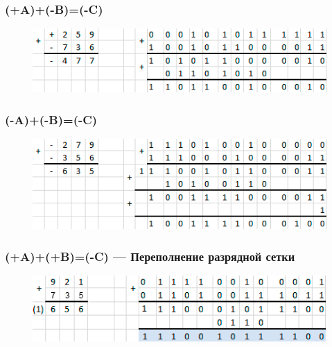 \documentclass[a4paper,14pt]{article}
\begin{document}
\subsubsection{(+A)+(-B)=(-C)}


\begin{figure}[H]
	\centering
	\includegraphics[width=0.7\linewidth]{primeri/pr_3_2}
	\caption{}
	\label{fig:screenshot003}
\end{figure}

\subsubsection{(-A)+(-B)=(-C)}


\begin{figure}[H]
	\centering
	\includegraphics[width=0.7\linewidth]{primeri/pr_4_2}
	\caption{}
	\label{fig:screenshot004}
\end{figure}

\subsubsection{(+A)+(+B)=(-C) — Переполнение разрядной сетки}


\begin{figure}[H]
	\centering
	\includegraphics[width=0.7\linewidth]{primeri/screenshot005}
	\caption{}
	\label{fig:screenshot005}
\end{figure}
\end{document}
